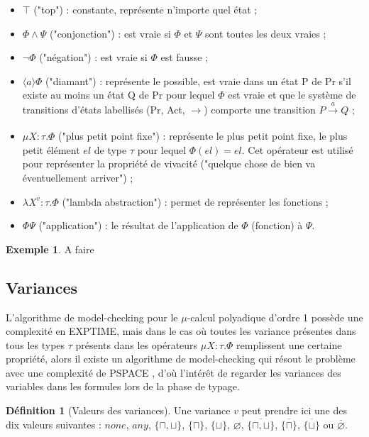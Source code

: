 \documentclass{rapport}
\theoremstyle{plain}
\theoremstyle{remark}
\theoremstyle{definition}
\newtheorem{dfn}{Définition}
\newtheorem{exem}{Exemple}
\begin{document}
\begin{itemize}
  \item $\top$ ("top") : constante, représente n'importe quel état ;
  \item $\Phi \wedge \Psi$ ("conjonction") : est vraie si $\Phi$ et $\Psi$ sont toutes les deux vraies ;
  \item $\neg\Phi$ ("négation") : est vraie si $\Phi$ est fausse ;
  \item $\langle a \rangle \Phi$ ("diamant") : représente le possible, est vraie dans un état P de Pr s'il existe au moins un état Q de Pr pour lequel $\Phi$ est vraie et que le système de transitions d'états labellisés (Pr, Act, $\rightarrow$) comporte une transition $P\xrightarrow[]{a} Q$ ;
  \item $\mu X : \tau . \Phi$ ("plus petit point fixe") : représente le plus petit point fixe, le plus petit élément $el$ de type $\tau$ pour lequel $\Phi (el) = el$. Cet opérateur est utilisé pour représenter la propriété de vivacité ("quelque chose de bien va éventuellement arriver") ; 
  \item $\lambda X^{v} : \tau . \Phi$ ("lambda abstraction") : permet de représenter les fonctions ;
  \item $\Phi \Psi$ ("application") : le résultat de l'application de $\Phi$ (fonction) à $\Psi$.
\end{itemize} 

\begin{exem}
A faire	
\end{exem}

\subsection{Variances\label{sec:variances}}

L'algorithme de model-checking pour le $\mu$-calcul polyadique d'ordre 1 possède une complexité en EXPTIME, mais dans le cas où toutes les variance présentes dans tous les types $\tau$ présents dans les opérateurs ${\mu X : \tau . \Phi}$ remplissent une certaine propriété, alors il existe un algorithme de model-checking qui résout le problème avec une complexité de PSPACE \citep{lange2014model}, d'où l'intérêt de regarder les variances des variables dans les formules lors de la phase de typage.     

\begin{dfn}[Valeurs des variances] Une variance $v$ peut prendre ici une des dix valeurs suivantes : $none$, $any$, $\{\sqcap, \sqcup\}$, $\{\sqcap\}$, $\{\sqcup\}$, $\varnothing$, $\overline{\{\sqcap, \sqcup\}}$, $\overline{\{\sqcap\}}$, $\overline{\{\sqcup\}}$ ou $\overline{\varnothing}$.
\end{dfn}
\end{document}
